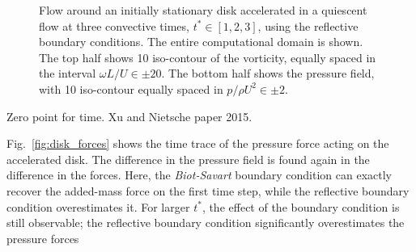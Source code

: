 \documentclass{article}
\begin{document}
\begin{figure}
\begin{subfigure}{.33\textwidth}
    \end{subfigure}
    \caption{Flow around an initially stationary disk accelerated in a quiescent flow at three convective times, $t^*\in [1,2,3]$, using the reflective boundary conditions. The entire computational domain is shown. The top half shows 10 iso-contour of the vorticity, equally spaced in the interval $\omega L/U\in\pm20$. The bottom half shows the pressure field, with 10 iso-contour equally spaced in $p/\rho U^2\in\pm2$.}
    \label{fig:disk_flow_1}
\end{figure}

Zero point for time. Xu and Nietsche paper 2015.

Fig.~\ref{fig:disk_forces} shows the time trace of the pressure force acting on the accelerated disk. The difference in the pressure field is found again in the difference in the forces. Here, the \emph{Biot-Savart} boundary condition can exactly recover the added-mass force on the first time step, while the reflective boundary condition overestimates it. For larger $t^*$, the effect of the boundary condition is still observable; the reflective boundary condition significantly overestimates the pressure forces
\end{document}
